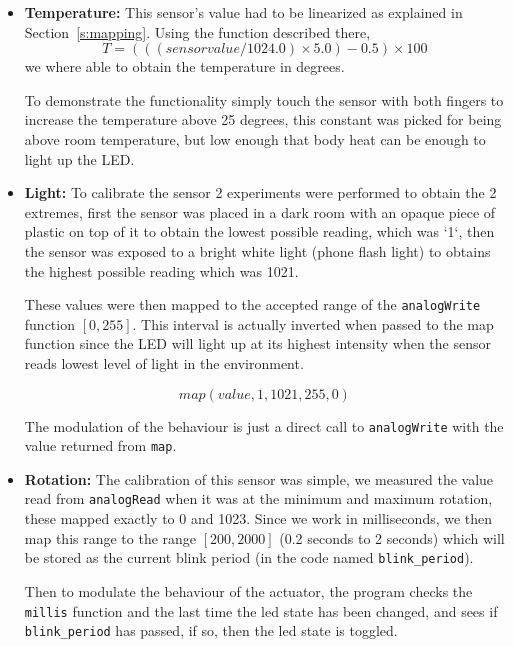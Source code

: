 \documentclass[10pt]{article}
\begin{document}
\begin{itemize}
    \item \textbf{Temperature:}
        This sensor's value had to be linearized as explained in
        Section~\ref{s:mapping}. Using the function described there,
        \[T = (((sensor value / 1024.0) \times 5.0) - 0.5) \times  100\]
        we where able to obtain the temperature in degrees.

        To demonstrate the functionality simply touch the sensor with both
        fingers to increase the temperature above 25 degrees, this constant was
        picked for being above room temperature, but low enough that body heat
        can be enough to light up the LED.
    \item \textbf{Light:}
        To calibrate the sensor 2 experiments were performed to obtain the 2
        extremes, first the sensor was placed in a dark room with an opaque piece
        of plastic on top of it to obtain the lowest possible reading, which was
        `1`, then the sensor was exposed to a bright white light (phone
        flash light) to obtains the highest possible reading which was 1021.

        These values were then mapped to the accepted range of the
        \texttt{analogWrite} function $[0, 255]$. This interval is actually
        inverted when passed to the map function since the LED will light up at
        its highest intensity when the sensor reads lowest level of light in the
        environment.

        \[map(value, 1, 1021, 255, 0)\]

        The modulation of the behaviour is just a direct call to
        \texttt{analogWrite} with the value returned from \texttt{map}.
    \item \textbf{Rotation:}
        The calibration of this sensor was simple, we measured the value read
        from \texttt{analogRead} when it was at the minimum and maximum
        rotation, these mapped exactly to 0 and 1023. Since we work in
        milliseconds, we then map this range to the range $[200, 2000]$ (0.2
        seconds to 2 seconds) which will be stored as the current blink period
        (in the code named \texttt{blink\_period}).

        Then to modulate the behaviour of the actuator, the program checks the
        \texttt{millis} function and the last time the led state has been
        changed, and sees if \texttt{blink\_period} has passed, if so, then the
        led state is toggled.
\end{itemize}
\end{document}
